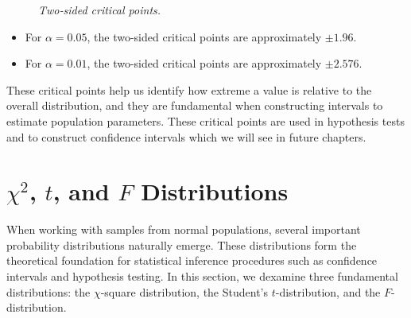 \documentclass[twoside]{book}
\begin{document}
\begin{figure}[H]
\begin{center}
    \caption{\textit{Two‐sided critical points.}}
\end{center}
\end{figure}

\begin{itemize}
	\item For \(\alpha = 0.05\), the two-sided critical points are approximately \(\pm 1.96\).
	\item For \(\alpha = 0.01\), the two-sided critical points are approximately \(\pm 2.576\).
\end{itemize}

These critical points help us identify how extreme a value is relative to the overall distribution, and they are fundamental when constructing intervals to estimate population parameters. These critical points are used in hypothesis tests and to construct confidence intervals which we will see in future chapters.


\section{$\chi^2$, $t$, and $F$ Distributions}
When working with samples from normal populations, several important probability distributions naturally emerge. These distributions form the theoretical foundation for statistical inference procedures such as confidence intervals and hypothesis testing. In this section, we dexamine three fundamental distributions: the $\chi$-square distribution, the Student's $ t $-distribution, and the $F$-distribution.
\end{document}
